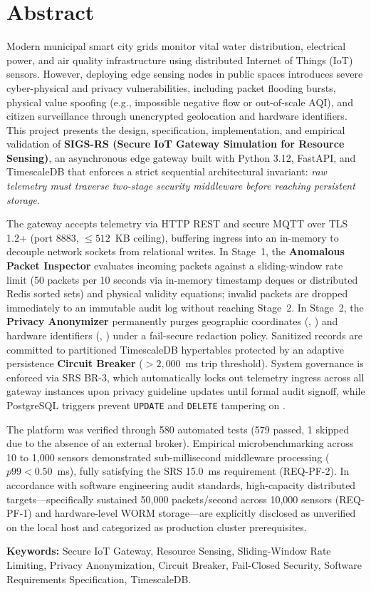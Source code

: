 {}
\section*{Abstract}

Modern municipal smart city grids monitor vital water distribution, electrical power, and air quality infrastructure using distributed Internet of Things (IoT) sensors. However, deploying edge sensing nodes in public spaces introduces severe cyber-physical and privacy vulnerabilities, including packet flooding bursts, physical value spoofing (e.g., impossible negative flow or out-of-scale AQI), and citizen surveillance through unencrypted geolocation and hardware identifiers. This project presents the design, specification, implementation, and empirical validation of \textbf{SIGS-RS (Secure IoT Gateway Simulation for Resource Sensing)}, an asynchronous edge gateway built with Python 3.12, FastAPI, and TimescaleDB that enforces a strict sequential architectural invariant: \emph{raw telemetry must traverse two-stage security middleware before reaching persistent storage}.

The gateway accepts telemetry via HTTP REST and secure MQTT over TLS 1.2+ (port 8883, $\le 512$~KB ceiling), buffering ingress into an in-memory  to decouple network sockets from relational writes. In Stage~1, the \textbf{Anomalous Packet Inspector} evaluates incoming packets against a sliding-window rate limit (50 packets per 10 seconds via in-memory timestamp deques or distributed Redis sorted sets) and physical validity equations; invalid packets are dropped immediately to an immutable audit log without reaching Stage~2. In Stage~2, the \textbf{Privacy Anonymizer} permanently purges geographic coordinates (, ) and hardware identifiers (, ) under a fail-secure redaction policy. Sanitized records are committed to partitioned TimescaleDB hypertables protected by an adaptive persistence \textbf{Circuit Breaker} ($> 2,000$~ms trip threshold). System governance is enforced via SRS BR-3, which automatically locks out telemetry ingress across all gateway instances upon privacy guideline updates until formal audit signoff, while PostgreSQL triggers prevent \texttt{UPDATE} and \texttt{DELETE} tampering on .

The platform was verified through 580 automated tests (579 passed, 1 skipped due to the absence of an external broker). Empirical microbenchmarking across 10 to 1,000 sensors demonstrated sub-millisecond middleware processing ($p99 < 0.50$~ms), fully satisfying the SRS 15.0~ms requirement (REQ-PF-2). In accordance with software engineering audit standards, high-capacity distributed targets---specifically sustained 50,000 packets/second across 10,000 sensors (REQ-PF-1) and hardware-level WORM storage---are explicitly disclosed as unverified on the local host and categorized as production cluster prerequisites.

\vspace{1.5em}
\noindent\textbf{Keywords:} Secure IoT Gateway, Resource Sensing, Sliding-Window Rate Limiting, Privacy Anonymization, Circuit Breaker, Fail-Closed Security, Software Requirements Specification, TimescaleDB.
\clearpage
